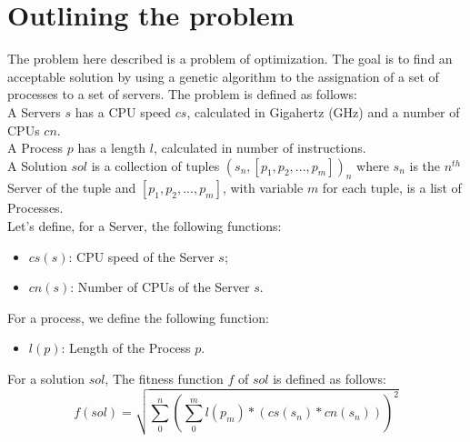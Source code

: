 \section{Outlining the problem}\label{sect:problem}

The problem here described is a problem of optimization. 
The goal is to find an acceptable solution by using a genetic algorithm to the assignation of a set of processes to a set of servers.
The problem is defined as follows:\\
A Servers $s$ has a CPU speed $cs$, calculated in Gigahertz (GHz) and a number of CPUs $cn$.\\
A Process $p$ has a length $l$, calculated in number of instructions.\\
A Solution $sol$ is a collection of tuples $(s_n, [p_1, p_2, ..., p_m])_{n}$ where $s_n$ is the $n^{th}$ Server of the tuple 
and $[p_1, p_2, ..., p_m]$, with variable $m$ for each tuple, is a list of Processes.\\
Let's define, for a Server, the following functions:
\begin{itemize}
    \item $cs(s)$: CPU speed of the Server $s$;
    \item $cn(s)$: Number of CPUs of the Server $s$.\\
\end{itemize}
For a process, we define the following function:
\begin{itemize}
    \item $l(p)$: Length of the Process $p$.\\
\end{itemize}

For a solution $sol$, The fitness function $f$ of $sol$ is defined as follows:
\begin{equation}
    \label{fitness}
    f(sol) = \sqrt{\sum_{0}^{n}{(\sum_{0}^{m}l(p_m) * (cs(s_n) * cn(s_n)))^2}}
\end{equation}
